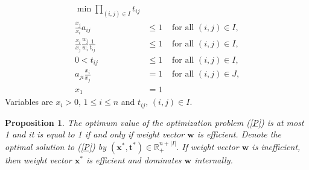 \documentclass{article}
\theoremstyle{plain}
\newtheorem{proposition}{Proposition}[section]
\begin{document}
\begin{align}
\min  \prod\limits_{(i,j)\in I } t_{ij}
     &  &  \nonumber  \\
\frac{x_j}{x_i} a_{ij} & \leq 1    &\text{ for all $(i,j) \in I$,} \nonumber  \\
\frac{x_i}{x_j} \frac{w_j}{w_i} \frac{1}{t_{ij}}  & \leq 1  &\text{ for all $(i,j) \in I$,} \label{P}  \\
0 < t_{ij}  & \leq 1 &\text{ for all $(i,j) \in I$,} \nonumber  \\
a_{ji} \frac{x_i}{x_j} & = 1    &\text{ for all $(i,j) \in J$,} \nonumber \\
                   x_1 & = 1    & \nonumber
\end{align}
Variables are $x_i > 0, \,  1 \leq i \leq n$ and $t_{ij}, \, (i,j) \in I.$ \\

\begin{proposition} \label{prop:P}
The optimum value of the optimization problem (\ref{P}) is at most 1 and it is equal to 1 if and only if
weight vector $\mathbf{w}$ is ef{\kern0pt}f{\kern0pt}icient.
Denote the optimal solution to (\ref{P}) by $(\mathbf{x}^{\ast},\mathbf{t}^{\ast}) \in \mathbb{R}^{n+|I|}_{+}.$
If weight vector $\mathbf{w}$ is inef{\kern0pt}f{\kern0pt}icient, then
weight vector $\mathbf{x}^{\ast}$ is ef{\kern0pt}f{\kern0pt}icient and dominates $\mathbf{w}$ internally.
\end{proposition}
\end{document}
